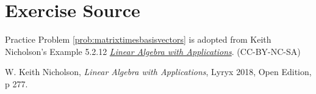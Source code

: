 \documentclass{ximera}
\begin{document}
\section*{Exercise Source}
Practice Problem \ref{prob:matrixtimesbasisvectors} is adopted from Keith Nicholson's Example 5.2.12  \href{https://open.umn.edu/opentextbooks/textbooks/linear-algebra-with-applications}{\it Linear Algebra with Applications}. (CC-BY-NC-SA)

W. Keith Nicholson, {\it Linear Algebra with Applications}, Lyryx 2018, Open Edition, p 277.
\end{document}
